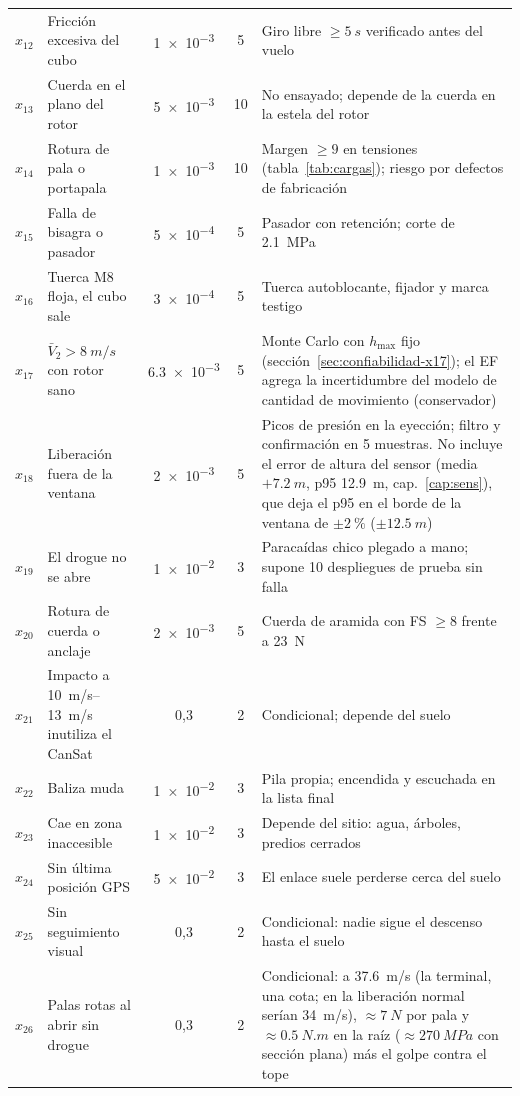 \begin{footnotesize}
\begin{longtable}{@{}>{\centering\arraybackslash}p{0.8cm}>{\raggedright\arraybackslash}p{4.5cm}cc>{\raggedright\arraybackslash}p{7.45cm}@{}}
$x_{12}$ & Fricción excesiva del cubo & \num{1e-3} & 5 & Giro libre $\ge\SI{5}{s}$ verificado antes del vuelo\\
$x_{13}$ & Cuerda en el plano del rotor & \num{5e-3} & 10 & No ensayado; depende de la cuerda en la estela del rotor\\
$x_{14}$ & Rotura de pala o portapala & \num{1e-3} & 10 & Margen $\ge9$ en tensiones (tabla~\ref{tab:cargas}); riesgo por defectos de fabricación\\
$x_{15}$ & Falla de bisagra o pasador & \num{5e-4} & 5 & Pasador con retención; corte de \SI{2.1}{MPa}\\
$x_{16}$ & Tuerca M8 floja, el cubo sale & \num{3e-4} & 5 & Tuerca autoblocante, fijador y marca testigo\\
$x_{17}$ & $\bar V_2>\SI{8}{m/s}$ con rotor sano & \num{6.3e-3} & 5 & Monte Carlo con $h_{\max}$ fijo (sección~\ref{sec:confiabilidad-x17}); el EF agrega la incertidumbre del modelo de cantidad de movimiento (conservador)\\
$x_{18}$ & Liberación fuera de la ventana & \num{2e-3} & 5 & Picos de presión en la eyección; filtro y confirmación en 5 muestras. No incluye el error de altura del sensor (media $+\SI{7.2}{m}$, p95 \SI{12.9}{m}, cap.~\ref{cap:sens}), que deja el p95 en el borde de la ventana de $\pm\SI{2}{\percent}$ ($\pm\SI{12.5}{m}$)\\
$x_{19}$ & El drogue no se abre & \num{1e-2} & 3 & Paracaídas chico plegado a mano; supone 10 despliegues de prueba sin falla\\
$x_{20}$ & Rotura de cuerda o anclaje & \num{2e-3} & 5 & Cuerda de aramida con FS $\ge8$ frente a \SI{23}{N}\\
$x_{21}$ & Impacto a \SIrange{10}{13}{m/s} inutiliza el CanSat & 0,3 & 2 & Condicional; depende del suelo\\
$x_{22}$ & Baliza muda & \num{1e-2} & 3 & Pila propia; encendida y escuchada en la lista final\\
$x_{23}$ & Cae en zona inaccesible & \num{1e-2} & 3 & Depende del sitio: agua, árboles, predios cerrados\\
$x_{24}$ & Sin última posición GPS & \num{5e-2} & 3 & El enlace suele perderse cerca del suelo\\
$x_{25}$ & Sin seguimiento visual & 0,3 & 2 & Condicional: nadie sigue el descenso hasta el suelo\\
$x_{26}$ & Palas rotas al abrir sin drogue & 0,3 & 2 & Condicional: a \SI{37.6}{m/s} (la terminal, una cota; en la liberación normal serían \SI{34}{m/s}), $\approx\SI{7}{N}$ por pala y $\approx\SI{0.5}{N.m}$ en la raíz ($\approx\SI{270}{MPa}$ con sección plana) más el golpe contra el tope\\
\end{longtable}
\end{footnotesize}

